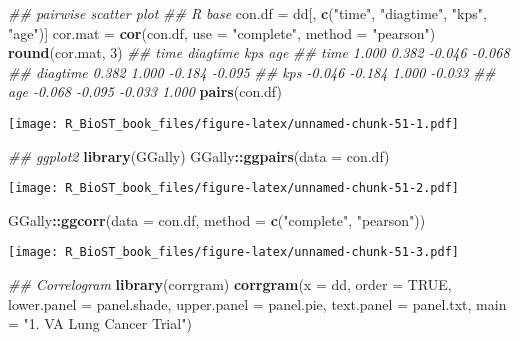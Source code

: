 \documentclass[
]{book}
\newenvironment{Shaded}{\begin{snugshade}}{\end{snugshade}}
\newcommand{\CommentTok}[1]{\textcolor[rgb]{0.56,0.35,0.01}{\textit{#1}}}
\newcommand{\DataTypeTok}[1]{\textcolor[rgb]{0.13,0.29,0.53}{#1}}
\newcommand{\DecValTok}[1]{\textcolor[rgb]{0.00,0.00,0.81}{#1}}
\newcommand{\KeywordTok}[1]{\textcolor[rgb]{0.13,0.29,0.53}{\textbf{#1}}}
\newcommand{\NormalTok}[1]{#1}
\newcommand{\OperatorTok}[1]{\textcolor[rgb]{0.81,0.36,0.00}{\textbf{#1}}}
\newcommand{\OtherTok}[1]{\textcolor[rgb]{0.56,0.35,0.01}{#1}}
\newcommand{\StringTok}[1]{\textcolor[rgb]{0.31,0.60,0.02}{#1}}
\begin{document}
\begin{Shaded}
\begin{Highlighting}[]
\CommentTok{\#\# pairwise scatter plot}
\CommentTok{\#\# R base}
\NormalTok{con.df =}\StringTok{ }\NormalTok{dd[, }\KeywordTok{c}\NormalTok{(}\StringTok{"time"}\NormalTok{, }\StringTok{"diagtime"}\NormalTok{, }\StringTok{"kps"}\NormalTok{, }\StringTok{"age"}\NormalTok{)]}
\NormalTok{cor.mat =}\StringTok{ }\KeywordTok{cor}\NormalTok{(con.df, }\DataTypeTok{use =} \StringTok{"complete"}\NormalTok{, }\DataTypeTok{method =} \StringTok{"pearson"}\NormalTok{)}
\KeywordTok{round}\NormalTok{(cor.mat, }\DecValTok{3}\NormalTok{)}
\CommentTok{\#\#            time diagtime    kps    age}
\CommentTok{\#\# time      1.000    0.382 {-}0.046 {-}0.068}
\CommentTok{\#\# diagtime  0.382    1.000 {-}0.184 {-}0.095}
\CommentTok{\#\# kps      {-}0.046   {-}0.184  1.000 {-}0.033}
\CommentTok{\#\# age      {-}0.068   {-}0.095 {-}0.033  1.000}
\KeywordTok{pairs}\NormalTok{(con.df)}
\end{Highlighting}
\end{Shaded}

\texttt{[image: R\_BioST\_book\_files/figure-latex/unnamed-chunk-51-1.pdf]}

\begin{Shaded}
\begin{Highlighting}[]
\CommentTok{\#\# ggplot2}
\KeywordTok{library}\NormalTok{(GGally)}
\NormalTok{GGally}\OperatorTok{::}\KeywordTok{ggpairs}\NormalTok{(}\DataTypeTok{data =}\NormalTok{ con.df)}
\end{Highlighting}
\end{Shaded}

\texttt{[image: R\_BioST\_book\_files/figure-latex/unnamed-chunk-51-2.pdf]}

\begin{Shaded}
\begin{Highlighting}[]
\NormalTok{GGally}\OperatorTok{::}\KeywordTok{ggcorr}\NormalTok{(}\DataTypeTok{data =}\NormalTok{ con.df, }
               \DataTypeTok{method =} \KeywordTok{c}\NormalTok{(}\StringTok{"complete"}\NormalTok{, }\StringTok{"pearson"}\NormalTok{))}
\end{Highlighting}
\end{Shaded}

\texttt{[image: R\_BioST\_book\_files/figure-latex/unnamed-chunk-51-3.pdf]}

\begin{Shaded}
\begin{Highlighting}[]
\CommentTok{\#\# Correlogram}
\KeywordTok{library}\NormalTok{(corrgram)}
\KeywordTok{corrgram}\NormalTok{(}\DataTypeTok{x =}\NormalTok{ dd, }
         \DataTypeTok{order =} \OtherTok{TRUE}\NormalTok{, }
         \DataTypeTok{lower.panel =}\NormalTok{ panel.shade, }
         \DataTypeTok{upper.panel =}\NormalTok{ panel.pie, }
         \DataTypeTok{text.panel =}\NormalTok{ panel.txt, }
         \DataTypeTok{main =} \StringTok{"1. VA Lung Cancer Trial"}\NormalTok{)}
\end{Highlighting}
\end{Shaded}
\end{document}
